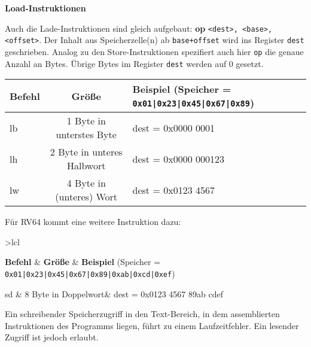 \pagebreak
\textbf{Load-Instruktionen}

Auch die Lade-Instruktionen sind gleich aufgebaut: \textbf{op} \texttt{<dest>,
<base>, <offset>}. Der Inhalt aus Speicherzelle(n) ab \texttt{base+offset} wird
ins Register \texttt{dest} geschrieben. Analog zu den Store-Instruktionen
spezifiert auch hier \texttt{op} die genaue Anzahl an Bytes. Übrige Bytes im
Register \texttt{dest} werden auf 0 gesetzt.
\begin{table}[H]
  \centering
  \begin{tabular}{>{\ttfamily}lcl}

    \normalfont\textbf{Befehl} & \textbf{Größe} & \textbf{Beispiel} (Speicher = \texttt{0x01|0x23|0x45|0x67|0x89})\\
    \toprule

  	lb & 1 Byte in unterstes Byte & dest = 0x0000 0001\\

  	lh & 2 Byte in unteres Halbwort & dest = 0x0000 000123\\

  	lw & 4 Byte in (unteres) Wort & dest =  0x0123 4567\\

  \end{tabular}
\end{table}
\vspace{-0.6cm}

Für RV64 kommt eine weitere Instruktion dazu:
\begin{table}[H]
  \centering
  \begin{tabular}{>{\ttfamily}{l}cl}

    \normalfont\textbf{Befehl} & \textbf{Größe} & \textbf{Beispiel} (Speicher = \footnotesize\texttt{0x01|0x23|0x45|0x67|0x89|0xab|0xcd|0xef})\\
    \toprule

  	sd & 8 Byte in Doppelwort& dest = 0x0123 4567 89ab cdef\\

  \end{tabular}
\end{table}
\vspace{-0.4cm}

\begin{warningblock}
  Ein schreibender Speicherzugriff in den Text-Bereich, in dem assemblierten
  Instruktionen des Programms liegen, führt zu einem Laufzeitfehler. Ein
  lesender Zugriff ist jedoch erlaubt.
\end{warningblock}

